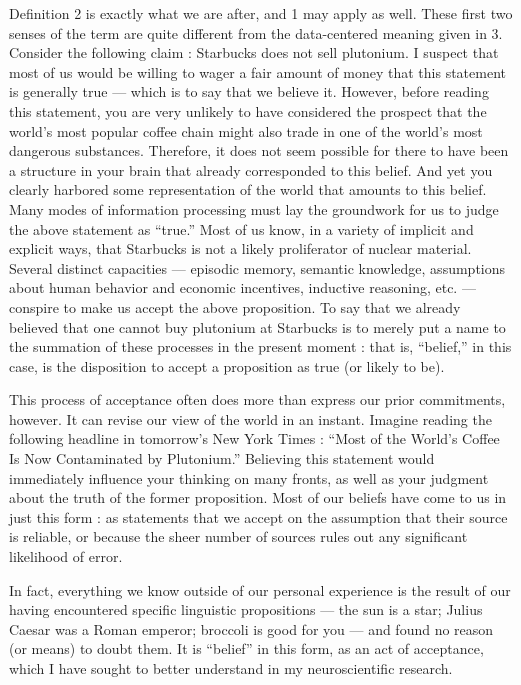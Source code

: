\documentclass[a4paper,14pt]{extbook}
\begin{document}
Definition 2 is exactly what we are after, and 1 may apply as well.
These first two senses of the term are quite different from the data-centered meaning given in 3.
Consider the following claim :
Starbucks does not sell plutonium.
I suspect that most of us would be willing to wager a fair amount of money that this statement is generally true --- which is to say that we believe it.
However, before reading this statement, you are very unlikely to have considered the prospect that the world’s most popular coffee chain might also trade in one of the world’s most dangerous substances.
Therefore, it does not seem possible for there to have been a structure in your brain that already corresponded to this belief.
And yet you clearly harbored some representation of the world that amounts to this belief.
Many modes of information processing must lay the groundwork for us to judge the above statement as ``true.''
Most of us know, in a variety of implicit and explicit ways, that Starbucks is not a likely proliferator of nuclear material.
Several distinct capacities --- episodic memory, semantic knowledge, assumptions about human behavior and economic incentives, inductive reasoning, etc. --- conspire to make us accept the above proposition.
To say that we already believed that one cannot buy plutonium at Starbucks is to merely put a name to the summation of these processes in the present moment :
that is, ``belief,'' in this case, is the disposition to accept a proposition as true (or likely to be).

This process of acceptance often does more than express our prior commitments, however.
It can revise our view of the world in an instant.
Imagine reading the following headline in tomorrow’s New York Times :
``Most of the World’s Coffee Is Now Contaminated by Plutonium.''
Believing this statement would immediately influence your thinking on many fronts, as well as your judgment about the truth of the former proposition.
Most of our beliefs have come to us in just this form :
as statements that we accept on the assumption that their source is reliable, or because the sheer number of sources rules out any significant likelihood of error.

In fact, everything we know outside of our personal experience is the result of our having encountered specific linguistic propositions --- the sun is a star;
Julius Caesar was a Roman emperor;
broccoli is good for you --- and found no reason (or means) to doubt them.
It is ``belief'' in this form, as an act of acceptance, which I have sought to better understand in my neuroscientific research.
\end{document}
